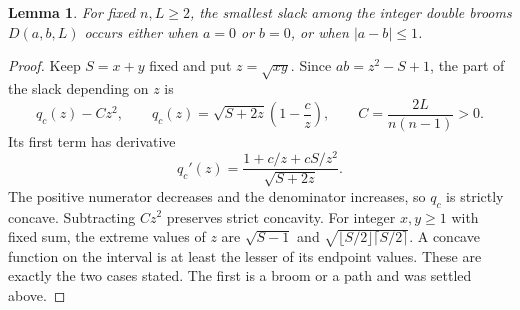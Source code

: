 \documentclass[11pt,a4paper]{article}
\newtheorem{lemma}[theorem]{Lemma}
\theoremstyle{remark}\newtheorem{remark}[theorem]{Remark}
\begin{document}
\begin{lemma}\label{lem:ch-double-broom-reduction}
For fixed $n,L\ge2$, the smallest slack among the integer double brooms
$D(a,b,L)$ occurs either when $a=0$ or $b=0$, or when $|a-b|\le1$.
\end{lemma}
\begin{proof}
Keep $S=x+y$ fixed and put $z=\sqrt{xy}$. Since $ab=z^2-S+1$, the
part of the slack depending on $z$ is
\[
 q_c(z)-Cz^2,\qquad
 q_c(z)=\sqrt{S+2z}\left(1-\frac cz\right),\qquad
 C=\frac{2L}{n(n-1)}>0.
\]
Its first term has derivative
\[
 q_c'(z)=\frac{1+c/z+cS/z^2}{\sqrt{S+2z}}.
\]
The positive numerator decreases and the denominator increases, so $q_c$
is strictly concave. Subtracting $Cz^2$ preserves strict concavity.
For integer $x,y\ge1$ with fixed sum, the extreme values of $z$ are
$\sqrt{S-1}$ and
$\sqrt{\lfloor S/2\rfloor\lceil S/2\rceil}$. A concave function on
the interval is at least the lesser of its endpoint values. These are
exactly the two cases stated. The first is a broom or a path and was
settled above.
\end{proof}
\end{document}

